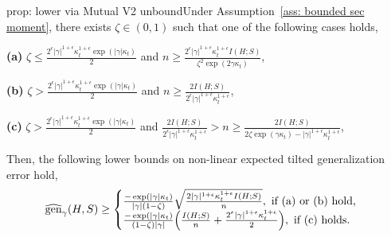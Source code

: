\documentclass{article}
\theoremstyle{plain}
\theoremstyle{plain}
\theoremstyle{definition}
\theoremstyle{remark}
\begin{document}
\begin{tcolorbox}
    \begin{repproposition}{prop: lower via Mutual V2 unbound}Under Assumption~\ref{ass: bounded sec moment}, there exists $\zeta\in(0,1)$ such that one of the following cases holds,

\textbf{(a)} $\zeta \leq \frac{2^{\epsilon}|\gamma|^{1+\epsilon} \kappa_t^{1+\epsilon} \exp(|\gamma|\kappa_t)}{2}$ and  $n \geq \frac{2^{\epsilon}|\gamma|^{1+\epsilon} \kappa_t^{1+\epsilon} I(H;S)}{\zeta^2\exp(2\gamma \kappa_t)}$,

\textbf{(b)} $\zeta > \frac{2^{\epsilon}|\gamma|^{1+\epsilon} \kappa_t^{1+\epsilon} \exp(|\gamma|\kappa_t)}{2}$ and $n \geq \frac{2I(H;S)}{2^{\epsilon}|\gamma|^{1+\epsilon} \kappa_t^{1+\epsilon}}$,

\textbf{(c)} $\zeta > \frac{2^{\epsilon}|\gamma|^{1+\epsilon} \kappa_t^{1+\epsilon} \exp(|\gamma|\kappa_t)}{2}$ and $\frac{2I(H;S)}{2^{\epsilon}|\gamma|^{1+\epsilon} \kappa_t^{1+\epsilon}} > n \geq \frac{2I(H;S)}{2\zeta \exp(\gamma\kappa_t)-|\gamma|^{1+\epsilon} \kappa_t^{1+\epsilon}}$,
    
    Then, the following lower bounds on non-linear expected tilted generalization error hold,
\begin{equation*}
    \begin{split}
          \widehat{\mathrm{gen}}_{\gamma}(H,S)\geq  \begin{cases}
           \frac{-\exp(|\gamma| \kappa_t)}{|\gamma|(1-\zeta)} \sqrt{\frac{2|\gamma|^{1+\epsilon} \kappa_t^{1+\epsilon} I(H;S)}{n}}, \mbox{ \text{if (a) or (b) hold,}}\\
              \frac{-\exp(|\gamma| \kappa_t)}{(1-\zeta) |\gamma|}\Big( \frac{ I(H;S)}{n}+\frac{2^{\epsilon}|\gamma|^{1+\epsilon} \kappa_t^{1+\epsilon}}{2}\Big), \mbox{ \text{if (c) holds}}.
          \end{cases}
    \end{split}
\end{equation*}
\end{repproposition}
\end{tcolorbox}
\end{document}

